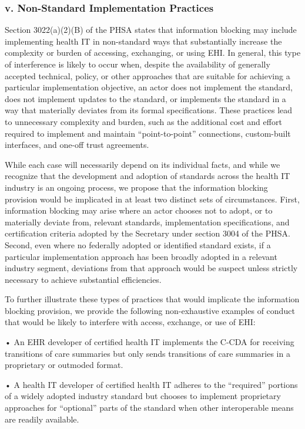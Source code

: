 \documentclass[twoside,11pt]{article}
\begin{document}
          \subsubsection{v. Non-Standard Implementation Practices}

          Section 3022(a)(2)(B) of the PHSA states that information blocking may include implementing health IT in non-standard ways that substantially increase the complexity or burden of accessing, exchanging, or using EHI. In general, this type of interference is likely to occur when, despite the availability of generally accepted technical, policy, or other approaches that are suitable for achieving a particular implementation objective, an actor does not implement the standard, does not implement updates to the standard, or implements the standard in a way that materially deviates from its formal specifications. These practices lead to unnecessary complexity and burden, such as the additional cost and effort required to implement and maintain “point-to-point” connections, custom-built interfaces, and one-off trust agreements.


          While each case will necessarily depend on its individual facts, and while we recognize that the development and adoption of standards across the health IT industry is an ongoing process, we propose that the information blocking provision would be implicated in at least two distinct sets of circumstances. First, information blocking may arise where an actor chooses not to adopt, or to materially deviate from, relevant standards, implementation specifications, and certification criteria adopted by the Secretary under section 3004 of the PHSA. Second, even where no federally adopted or identified standard exists, if a particular implementation approach has been broadly adopted in a relevant industry segment, deviations from that approach would be suspect unless strictly necessary to achieve substantial efficiencies.


          To further illustrate these types of practices that would implicate the information blocking provision, we provide the following non-exhaustive examples of conduct that would be likely to interfere with access, exchange, or use of EHI:


          • An EHR developer of certified health IT implements the C-CDA for receiving transitions of care summaries but only sends transitions of care summaries in a proprietary or outmoded format.


          • A health IT developer of certified health IT adheres to the “required” portions of a widely adopted industry standard but chooses to implement proprietary approaches for “optional” parts of the standard when other interoperable means are readily available.
\end{document}
